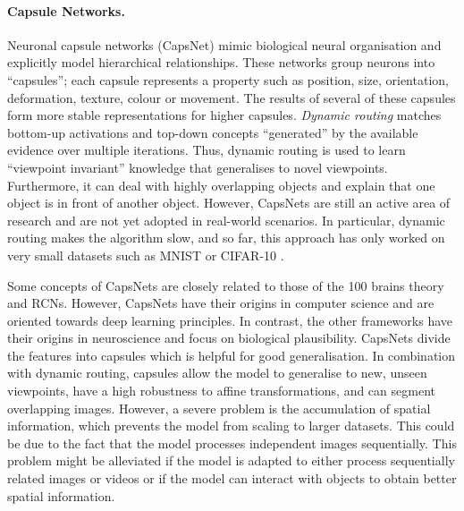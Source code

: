 \paragraph{Capsule Networks.} Neuronal capsule networks (CapsNet)  mimic biological neural organisation and explicitly model hierarchical relationships. These networks group neurons into ``capsules''; each capsule represents a property such as position, size, orientation, deformation, texture, colour or movement. The results of several of these capsules form more stable representations for higher capsules. \emph{Dynamic routing} matches bottom-up activations and top-down concepts ``generated'' by the available evidence over multiple iterations. Thus, dynamic routing is used to learn ``viewpoint invariant'' knowledge that generalises to novel viewpoints.
Furthermore, it can deal with highly overlapping objects and explain that one object is in front of another object. However, CapsNets are still an active area of research and are not yet adopted in real-world scenarios. In particular, dynamic routing makes the algorithm slow, and so far, this approach has only worked on very small datasets such as MNIST \cite{lecun_gradient-based_1998} or CIFAR-10 \cite{krizhevsky_learning_2009}.

Some concepts of CapsNets are closely related to those of the 100 brains theory and RCNs. However, CapsNets have their origins in computer science and are oriented towards deep learning principles. In contrast, the other frameworks have their origins in neuroscience and focus on biological plausibility. CapsNets divide the features into capsules which is helpful for good generalisation. In combination with dynamic routing, capsules allow the model to generalise to new, unseen viewpoints, have a high robustness to affine transformations, and can segment overlapping images. However, a severe problem is the accumulation of spatial information, which prevents the model from scaling to larger datasets. This could be due to the fact that the model processes independent images sequentially. This problem might be alleviated if the model is adapted to either process sequentially related images or videos or if the model can interact with objects to obtain better spatial information.


